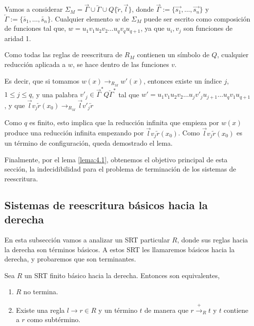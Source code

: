 \begin{demo}
  Vamos a considerar
  $\Sigma_M = \overrightarrow{\Gamma} \cup \overleftarrow{\Gamma} \cup
  Q \{ \overleftarrow{r} , \overrightarrow{l} \} $, donde
  $\overrightarrow{\Gamma} := \{\overrightarrow{s_1}, \dots,
  \overrightarrow{s_n} \}$ y
  $\overleftarrow{\Gamma} := \{ \overleftarrow{s_1}, \dots,
  \overleftarrow{s_n} \}$. Cualquier elemento $w$ de $\Sigma_M$ puede
  ser escrito como composición de funciones tal que,
  $w = u_1 v_1 u_2 v_2 \dots u_q v_q u_{q+1}$, ya que $u_i, v_j$ son
  funciones de aridad 1.

  Como todas las reglas de reescritura de $R_M$ contienen un símbolo
  de $Q$, cualquier reducción aplicada a $w$, se hace dentro de las
  funciones $v$.

  Es decir, que si tomamos $w(x) \rightarrow_{R_M} w'(x)$, entonces
  existe un índice $j$, $1 \leq j \leq q$, y una palabra
  $v'_j \in \overrightarrow{\Gamma}^{*} Q \overleftarrow{\Gamma}^{*}$
  tal que
  $w'= u_1 v_1 u_2 v_2 \dots u_j v'_j u_{j+1} \dots u_q v_1 u_{q+1}$,
  y que
  $\overrightarrow{l} v_j \overleftarrow{r} (x_0) \rightarrow_{R_M}
  \overrightarrow{l} v'_j \overleftarrow{r}$
  
  Como $q$ es finito, esto implica que la reducción infinita que
  empieza por $w(x)$ produce una reducción infinita empezando por
  $\overrightarrow{l} v_j \overleftarrow{r} (x_0)$. Como
  $\overrightarrow{l} v_j \overleftarrow{r} (x_0)$ es un término de
  configuración, queda demostrado el lema.
\end{demo}

Finalmente, por el lema \ref{lema:4.1}, obtenemos el objetivo principal
de esta sección, la indecidibilidad para el problema de terminación de
los sistemas de reescritura.


\subsection{Sistemas de reescritura básicos hacia la derecha}

En esta subsección vamos a analizar un SRT particular $R$, donde sus
reglas hacia la derecha son términos básicos. A estos SRT les
llamaremos básicos hacia la derecha, y probaremos que son terminantes.

\begin{lema} \label{globfin}
  Sea $R$ un SRT finito básico hacia la derecha. Entonces son
  equivalentes,
  \begin{enumerate}
  \item $R$ no termina.
  \item Existe una regla $l \rightarrow r \in R$ y un término $t$ de
    manera que $r \xrightarrow{+}_R t$ y $t$ contiene a $r$ como
    subtérmino.
  \end{enumerate}
\end{lema}

